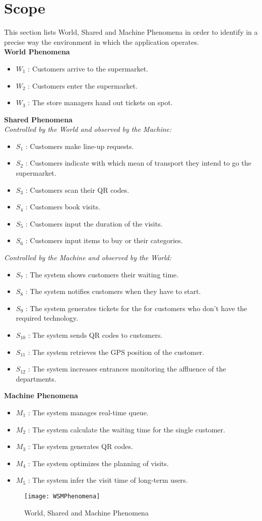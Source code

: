 \section{Scope}
This section lists World, Shared and Machine Phenomena in order to identify in a precise way the environment in which the application operates. \\
\textbf{World Phenomena}
\begin{itemize}
	\item $W_1$ : Customers arrive to the supermarket.
	\item $W_2$ : Customers enter the supermarket.
	\item $W_3$ : The store managers hand out tickets on spot.
\end{itemize}
\textbf{Shared Phenomena}\\
\textit{Controlled by the World and observed by the Machine:}
\begin{itemize}
	\item $S_1$ : Customers make line-up requests.
	\item $S_2$ : Customers indicate with which mean of transport they intend to go the supermarket.
	\item $S_3$ : Customers scan their QR codes.
	\item $S_4$ : Customers book visits.
	\item $S_5$ : Customers input the duration of the visits.
	\item $S_6$ : Customers input items to buy or their categories.
\end{itemize}
\textit{Controlled by the Machine and observed by the World:}
\begin{itemize}
	\item $S_7$ : The system shows customers their waiting time.
	\item $S_8$ : The system notifies customers when they have to start.
	\item $S_9$ : The system generates tickets for the for customers who don't have the required technology.
	\item $S_{10}$ : The system sends QR codes to customers.
	\item $S_{11}$ : The system retrieves the GPS position of the customer.
	\item $S_{12}$ : The system increases entrances monitoring the affluence of the departments.
\end{itemize}
\textbf{Machine Phenomena}
\begin{itemize}
	\item $M_1$ : The system manages real-time queue.
	\item $M_2$ : The system calculate the waiting time for the single customer.
	\item $M_3$ : The system generates QR codes.
	\item $M_4$ : The system optimizes the planning of visits.
	\item $M_5$ : The system infer the visit time of long-term users. 
\end{itemize} 

\begin{figure}[H] 
\centerline{\texttt{[image: WSMPhenomena]}}
\caption{World, Shared and Machine Phenomena}
\end{figure}


